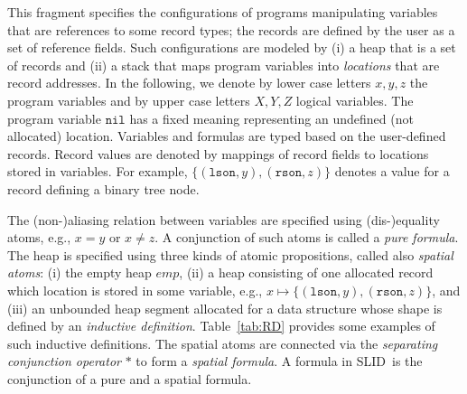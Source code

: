 \documentclass[twoside,11pt]{article}
\newcommand{\posep}{*}
\newcommand{\points}{\mapsto}
\newcommand{\nil}{\mathtt{nil}}
\newcommand{\SLRD}{\textsc{SLID}}
\begin{document}
This fragment specifies the configurations of programs manipulating variables that are references to some record types; the records are defined by the user as a set of reference fields.
Such configurations are modeled by
(i) a heap that is a set of records and
(ii) a stack that maps program variables into \emph{locations} that are record addresses.
%
In the following, we denote by lower case letters $x,y,z$ the program variables and by upper case letters $X,Y,Z$ logical variables. The program variable $\nil$ has a fixed meaning representing an undefined (not allocated) location.
%
Variables and formulas are typed based on the user-defined records. Record values are denoted by mappings of record fields to locations stored in variables. For example, $\{(\texttt{lson},y), (\texttt{rson},z)\}$ denotes a value for a record defining a binary tree node.

The (non-)aliasing relation between variables are specified using (dis-)equality atoms, e.g., $x = y$ or $x\neq z$. A conjunction of such atoms is called a \emph{pure formula}. 
%
The heap is specified using three kinds of atomic propositions, called also \emph{spatial atoms}:
(i) the empty heap $\mathit{emp}$, 
(ii) a heap consisting of one allocated record which location is stored in some variable, e.g., $x \points \{(\texttt{lson},y), (\texttt{rson},z)\}$,
and
(iii) an unbounded heap segment allocated for a data structure whose shape is defined by an \emph{inductive definition}.
Table~\ref{tab:RD} provides some examples of such inductive definitions. 
The spatial atoms are connected via the \emph{separating conjunction operator} $\posep$ to form a \emph{spatial formula}. 
A formula in \SLRD\ is the conjunction of a pure and a spatial formula.
\end{document}
